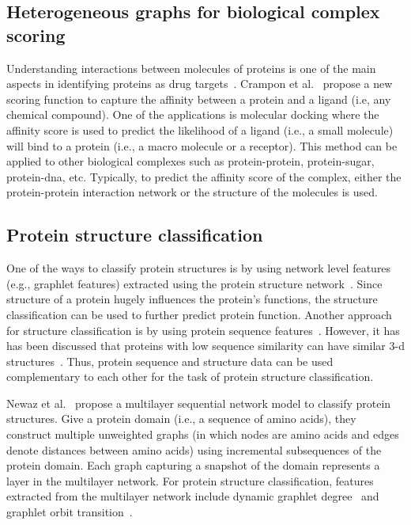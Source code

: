 \documentclass[10pt,letterpaper]{article}
\begin{document}
\subsection*{Heterogeneous graphs for biological complex scoring}
Understanding interactions between molecules of proteins is one of the main aspects in identifying proteins as drug targets~\cite{xie2023undruggable}. Crampon et al.~\cite{crampon2023heterogeneous} propose a new scoring function to capture the affinity between a protein and a ligand (i.e, any chemical compound). One of the applications is molecular docking where the affinity score is used to predict the likelihood of a ligand (i.e., a small molecule) will bind to a protein (i.e., a macro molecule or a receptor). This method can be applied to other biological complexes such as protein-protein, protein-sugar, protein-dna, etc. Typically, to predict the affinity score of the complex, either the protein-protein interaction network or the structure of the molecules is used. 

\subsection*{Protein structure classification}
One of the ways to classify protein structures is by using network level features (e.g., graphlet features) extracted using the protein structure network~\cite{khalique2022multilayer}. Since structure of a protein hugely influences the protein's functions, the structure classification can be used to further predict protein function. Another approach for structure classification is by using protein sequence features~\cite{jiaqi2016ensemble}. However, it has has been discussed that proteins with low sequence similarity can have similar 3-d structures~\cite{sousounis2012conservation, kosloff2008sequence}. Thus, protein sequence and structure data can be used complementary to each other for the task of protein structure classification. 

Newaz et al.~\cite{khalique2022multilayer} propose a multilayer sequential network model to classify protein structures. Give a protein domain (i.e., a sequence of amino acids), they construct multiple unweighted graphs (in which nodes are amino acids and edges denote distances between amino acids) using incremental subsequences of the protein domain. Each graph capturing a snapshot of the domain represents a layer in the multilayer network. For protein structure classification, features extracted from the multilayer network include dynamic graphlet degree~\cite{hulovatyy2015structure} and graphlet orbit transition~\cite{aparicio2018transitions, aparicio2019network}. 
\end{document}
